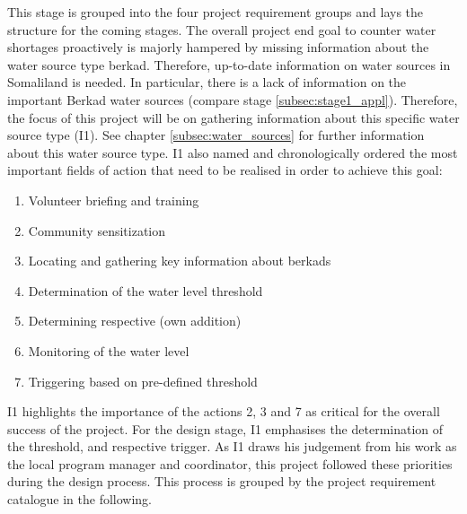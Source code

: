This stage is grouped into the four project requirement groups and lays the structure for the coming stages. The overall project end goal to counter water shortages proactively is majorly hampered by missing information about the water source type berkad. Therefore, up-to-date information on water sources in Somaliland is needed. In particular, there is a lack of information on the important Berkad water sources (compare stage \ref*{subsec:stage1_appl}). Therefore, the focus of this project will be on gathering information about this specific water source type (I1). See chapter \ref*{subsec:water_sources} for further information about this water source type. I1 also named and chronologically ordered the most important fields of action that need to be realised in order to achieve this goal:

\begin{enumerate}
    \item Volunteer briefing and training
    \item Community sensitization
    \item Locating and gathering key information about berkads
    \item Determination of the water level threshold 
    \item Determining respective  (own addition)
    \item Monitoring of the water level
    \item Triggering  based on pre-defined threshold    
\end{enumerate}

I1 highlights the importance of the actions 2, 3 and 7 as critical for the overall success of the project. For the design stage, I1 emphasises the determination of the threshold,  and respective trigger. As I1 draws his judgement from his work as the local program manager and coordinator, this project followed these priorities during the design process. This process is grouped by the project requirement catalogue in the following.




